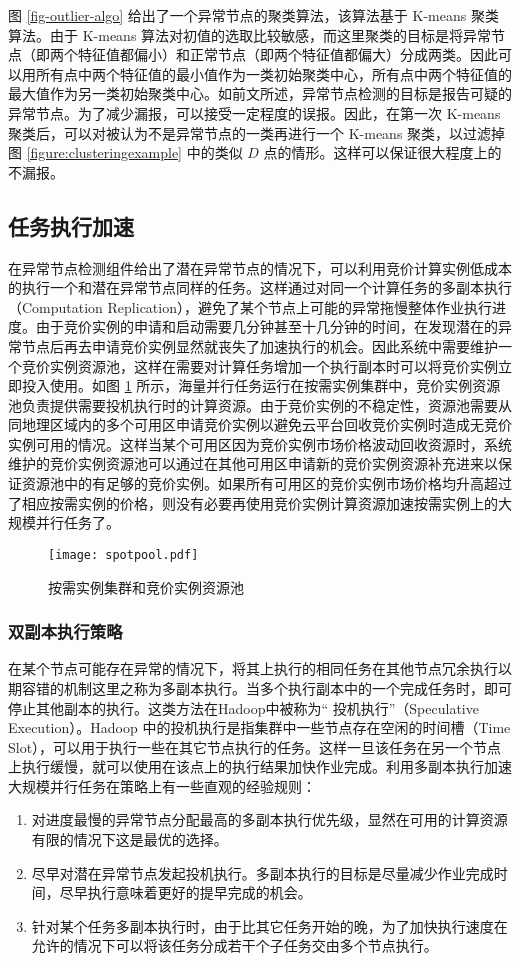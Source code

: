 图 \ref{fig-outlier-algo} 给出了一个异常节点的聚类算法，该算法基于 K-means 聚类算法。由于 K-means 算法对初值的选取比较敏感，而这里聚类的目标是将异常节点（即两个特征值都偏小）和正常节点（即两个特征值都偏大）分成两类。因此可以用所有点中两个特征值的最小值作为一类初始聚类中心，所有点中两个特征值的最大值作为另一类初始聚类中心。如前文所述，异常节点检测的目标是报告可疑的异常节点。为了减少漏报，可以接受一定程度的误报。因此，在第一次 K-means 聚类后，可以对被认为不是异常节点的一类再进行一个 K-means 聚类，以过滤掉图 \ref{figure:clusteringexample} 中的类似 $D$ 点的情形。这样可以保证很大程度上的不漏报。

\subsection{任务执行加速}
在异常节点检测组件给出了潜在异常节点的情况下，可以利用竞价计算实例低成本的执行一个和潜在异常节点同样的任务。这样通过对同一个计算任务的多副本执行（Computation Replication），避免了某个节点上可能的异常拖慢整体作业执行进度。由于竞价实例的申请和启动需要几分钟甚至十几分钟的时间，在发现潜在的异常节点后再去申请竞价实例显然就丧失了加速执行的机会。因此系统中需要维护一个竞价实例资源池，这样在需要对计算任务增加一个执行副本时可以将竞价实例立即投入使用。如图 \ref{figure:spotpool} 所示，海量并行任务运行在按需实例集群中，竞价实例资源池负责提供需要投机执行时的计算资源。由于竞价实例的不稳定性，资源池需要从同地理区域内的多个可用区申请竞价实例以避免云平台回收竞价实例时造成无竞价实例可用的情况。这样当某个可用区因为竞价实例市场价格波动回收资源时，系统维护的竞价实例资源池可以通过在其他可用区申请新的竞价实例资源补充进来以保证资源池中的有足够的竞价实例。如果所有可用区的竞价实例市场价格均升高超过了相应按需实例的价格，则没有必要再使用竞价实例计算资源加速按需实例上的大规模并行任务了。
\begin{figure}
  \centering
  \texttt{[image: spotpool.pdf]}
  \caption{按需实例集群和竞价实例资源池}
  \label{figure:spotpool}
\end{figure}

\subsubsection{双副本执行策略}
在某个节点可能存在异常的情况下，将其上执行的相同任务在其他节点冗余执行以期容错的机制这里之称为多副本执行。当多个执行副本中的一个完成任务时，即可停止其他副本的执行。这类方法在Hadoop中被称为`` 投机执行''（Speculative Execution）。Hadoop 中的投机执行是指集群中一些节点存在空闲的时间槽（Time Slot），可以用于执行一些在其它节点执行的任务。这样一旦该任务在另一个节点上执行缓慢，就可以使用在该点上的执行结果加快作业完成。利用多副本执行加速大规模并行任务在策略上有一些直观的经验规则：
\begin{enumerate}
\item 对进度最慢的异常节点分配最高的多副本执行优先级，显然在可用的计算资源有限的情况下这是最优的选择。
\item 尽早对潜在异常节点发起投机执行。多副本执行的目标是尽量减少作业完成时间，尽早执行意味着更好的提早完成的机会。
\item 针对某个任务多副本执行时，由于比其它任务开始的晚，为了加快执行速度在允许的情况下可以将该任务分成若干个子任务交由多个节点执行。
\end{enumerate}

